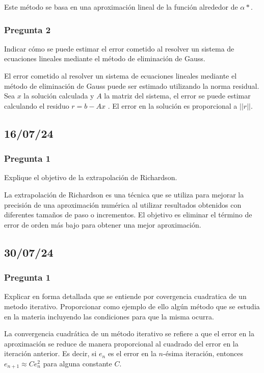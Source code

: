 Este método se basa en una aproximación lineal de la función alrededor de $\alpha*$.


\subsubsection{Pregunta 2}
Indicar cómo se puede estimar el error cometido al resolver un sistema de ecuaciones lineales mediante el método de eliminación de Gauss.

El error cometido al resolver un sistema de ecuaciones lineales mediante el método de eliminación de Gauss puede ser estimado utilizando la norma residual. Sea $x$ la solución calculada y $A$ la matriz del sistema, el error se puede estimar calculando el residuo $r=b-Ax$ . El error en la solución es proporcional a $|| r ||$.

\subsection{16/07/24}

\subsubsection{Pregunta 1}
Explique el objetivo de la extrapolación de Richardson.

La extrapolación de Richardson es una técnica que se utiliza para mejorar la precisión de una aproximación numérica al utilizar resultados obtenidos con diferentes tamaños de paso o incrementos. El objetivo es eliminar el término de error de orden más bajo para obtener una mejor aproximación.



\subsection{30/07/24}
\subsubsection{Pregunta 1}
Explicar en forma detallada que se entiende por covergencia cuadratica de un metodo iterativo. Proporcionar como ejemplo de ello algún método que se estudia en la materia incluyendo las condiciones para que la misma ocurra. 

La convergencia cuadrática de un método iterativo se refiere a que el error en la aproximación se reduce de manera proporcional al cuadrado del error en la iteración anterior. Es decir, si \( e_n \) es el error en la \( n \)-ésima iteración, entonces \( e_{n+1} \approx C e_n^2 \) para alguna constante \( C \).

